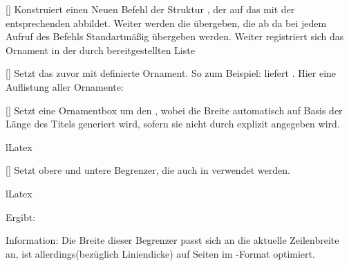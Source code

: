 %
%
%

[]
Konstruiert einen Neuen Befehl der Struktur , der auf das  mit der entsprechenden  abbildet. Weiter werden die  übergeben, die ab da bei jedem Aufruf des Befehls Standartmäßig übergeben werden. Weiter registriert sich das Ornament in der durch  bereitgestellten Liste 

%
%
%

[]
Setzt das zuvor mit  definierte Ornament. So zum Beispiel:  liefert \ornalion.\newline
Hier eine Auflistung aller Ornamente:
\getRegisteredOrnaments%
\expandafter\typesetList[T]{\lillyxlist}

%
%
%

[]
Setzt eine Ornamentbox um den , wobei die Breite automatisch auf Basis der Länge des Titels generiert wird, sofern sie nicht durch  explizit angegeben wird.
\begin{defaultlst}[][listing side text,righthand width=7cm]{lLatex}
\begin{center}
\end{center}
\end{defaultlst}

%
%
%

[\secline{}\cmdlist{}]
Setzt obere und untere Begrenzer, die auch in  verwendet werden.
\begin{defaultlst}{lLatex}

\end{defaultlst}
Ergibt:\\

Information: Die Breite dieser Begrenzer passt sich an die aktuelle Zeilenbreite an, ist allerdings(bezüglich Liniendicke) auf Seiten im -Format optimiert.

